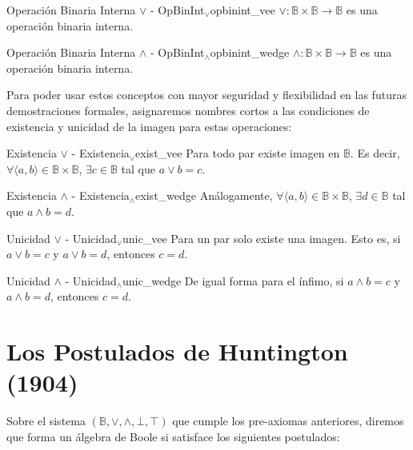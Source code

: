 \documentclass[12pt,a4paper]{article}
\begin{document}
\begin{preaxioma}{Operación Binaria Interna $\vee$ - OpBinInt$_\vee$}{opbinint_vee}
$\vee : \mathbb{B} \times \mathbb{B} \to \mathbb{B}$ es una operación binaria interna.
\end{preaxioma}

\begin{preaxioma}{Operación Binaria Interna $\wedge$ - OpBinInt$_\wedge$}{opbinint_wedge}
$\wedge : \mathbb{B} \times \mathbb{B} \to \mathbb{B}$ es una operación binaria interna.
\end{preaxioma}

Para poder usar estos conceptos con mayor seguridad y flexibilidad en las futuras demostraciones formales, asignaremos nombres cortos a las condiciones de existencia y unicidad de la imagen para estas operaciones:

\begin{preaxioma}{Existencia $\vee$ - Existencia$_\vee$}{exist_vee}
Para todo par existe imagen en $\mathbb{B}$. Es decir, $\forall \langle a,b \rangle \in \mathbb{B} \times \mathbb{B}$, $\exists c \in \mathbb{B}$ tal que $a \vee b = c$.
\end{preaxioma}

\begin{preaxioma}{Existencia $\wedge$ - Existencia$_\wedge$}{exist_wedge}
Análogamente, $\forall \langle a,b \rangle \in \mathbb{B} \times \mathbb{B}$, $\exists d \in \mathbb{B}$ tal que $a \wedge b = d$.
\end{preaxioma}

\begin{preaxioma}{Unicidad $\vee$ - Unicidad$_\vee$}{unic_vee}
Para un par solo existe una imagen. Esto es, si $a \vee b = c$ y $a \vee b = d$, entonces $c = d$.
\end{preaxioma}

\begin{preaxioma}{Unicidad $\wedge$ - Unicidad$_\wedge$}{unic_wedge}
De igual forma para el ínfimo, si $a \wedge b = c$ y $a \wedge b = d$, entonces $c = d$.
\end{preaxioma}

\section{Los Postulados de Huntington (1904)}
Sobre el sistema $(\mathbb{B}, \vee, \wedge, \bot, \top)$ que cumple los pre-axiomas anteriores, diremos que forma un álgebra de Boole si satisface los siguientes postulados:
\end{document}

